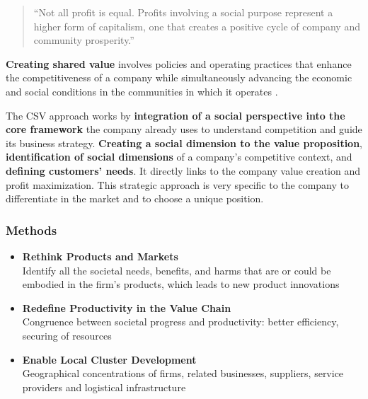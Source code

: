 \documentclass[11pt]{article}
\theoremstyle{definition}
\begin{document}
\begin{quote}
	\textquotedblleft Not all profit is equal. Profits involving a social purpose represent a higher form of capitalism, one that creates a positive cycle of company and community prosperity.\textquotedblright
\end{quote}

\begin{definition}
	\textbf{Creating shared value} involves policies and operating practices that enhance the competitiveness of a company while simultaneously advancing the economic and social conditions in the communities in which it operates \parencite{kramer2011creating}.
\end{definition}

\vspace*{1em}
\noindent
The CSV approach works by \textbf{integration of a social perspective into the core framework} the company already uses to understand competition and guide its business strategy. \textbf{Creating a social dimension to the value proposition},  \textbf{identification of social dimensions} of a company’s competitive context, and \textbf{defining customers' needs}. It directly links to the company value creation and profit maximization. This strategic approach is very specific to the company to differentiate in the market and to choose a unique position.

\subsubsection{Methods}
\begin{itemize}
	\item \textbf{Rethink Products and Markets}\\
	Identify all the societal needs, benefits, and harms that are or could be embodied in the firm’s products, which leads to new product innovations
	\item  \textbf{Redefine Productivity in the Value Chain}\\
	Congruence between societal progress and productivity: better efficiency, securing of resources
	\item \textbf{Enable Local Cluster Development}\\
	Geographical concentrations of firms, related businesses, suppliers, service providers and logistical infrastructure
\end{itemize}
\end{document}
